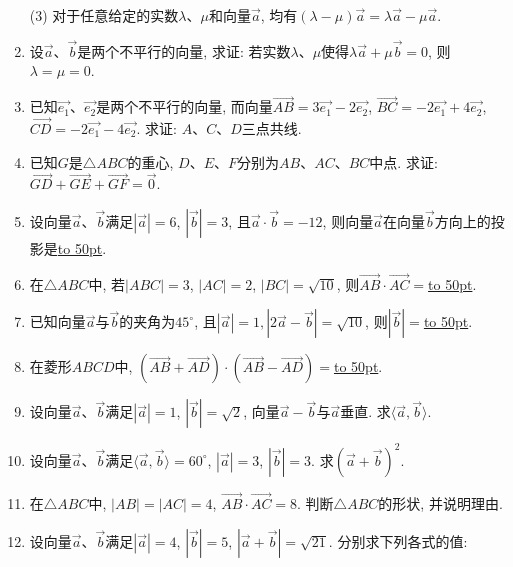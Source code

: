 \documentclass[10pt,a4paper]{article}
\newcommand{\blank}[1]{\underline{\hbox to #1pt{}}}
\begin{document}
\begin{enumerate}[1.]
(3) 对于任意给定的实数$\lambda$、$\mu$和向量$\overrightarrow a$, 均有$(\lambda -\mu)\overrightarrow a=\lambda \overrightarrow a-\mu\overrightarrow a$.
\item 设$\overrightarrow a$、$\overrightarrow b$是两个不平行的向量, 求证: 若实数$\lambda$、$\mu$使得$\lambda \overrightarrow a+\mu\overrightarrow b=0$, 则$\lambda =\mu=0$.
\item 已知$\overrightarrow {e_1}$、$\overrightarrow {e_2}$是两个不平行的向量, 而向量$\overrightarrow{AB}=3\overrightarrow {e_1}-2\overrightarrow {e_2}$, $\overrightarrow{BC}=-2\overrightarrow {e_1}+4\overrightarrow {e_2}$, $\overrightarrow{CD}=-2\overrightarrow {e_1}-4\overrightarrow {e_2}$. 求证: $A$、$C$、$D$三点共线.
\item 已知$G$是$\triangle ABC$的重心, $D$、$E$、$F$分别为$AB$、$AC$、$BC$中点. 求证: $\overrightarrow{GD}+\overrightarrow{GE}+\overrightarrow{GF}=\overrightarrow 0$.
\item 设向量$\overrightarrow a$、$\overrightarrow b$满足$|\overrightarrow a|=6$, $|\overrightarrow b|=3$, 且$\overrightarrow a\cdot \overrightarrow b=-12$, 则向量$\overrightarrow a$在向量$\overrightarrow b$方向上的投影是\blank{50}.
\item 在$\triangle ABC$中, 若$|ABC|=3$, $|AC|=2$, $|BC|=\sqrt {10}$, 则$\overrightarrow{AB}\cdot \overrightarrow{AC}=$\blank{50}.
\item 已知向量$\overrightarrow a$与$\overrightarrow b$的夹角为$45^\circ$, 且$|\overrightarrow a|=1,|2\overrightarrow a-\overrightarrow b|=\sqrt {10}$, 则$|\overrightarrow b|=$\blank{50}.
\item 在菱形$ABCD$中, $(\overrightarrow{AB}+\overrightarrow{AD})\cdot (\overrightarrow{AB}-\overrightarrow{AD})=$\blank{50}.
\item 设向量$\overrightarrow a$、$\overrightarrow b$满足$|\overrightarrow a|=1$, $|\overrightarrow b|=\sqrt 2$, 向量$\overrightarrow a-\overrightarrow b$与$\overrightarrow a$垂直. 求$\langle \overrightarrow a, \overrightarrow b\rangle$.
\item 设向量$\overrightarrow a$、$\overrightarrow b$满足$\langle \overrightarrow a, \overrightarrow b\rangle =60^\circ$, $|\overrightarrow a|=3$, $|\overrightarrow b|=3$. 求$(\overrightarrow a+\overrightarrow b)^2$.
\item 在$\triangle ABC$中, $|AB|=|AC|=4$, $\overrightarrow{AB}\cdot \overrightarrow{AC}=8$. 判断$\triangle ABC$的形状, 并说明理由.
\item 设向量$\overrightarrow a$、$\overrightarrow b$满足$|\overrightarrow a|=4$, $|\overrightarrow b|=5$, $|\overrightarrow a+\overrightarrow b|=\sqrt{21}$. 分别求下列各式的值:\\

\end{enumerate}
\end{document}
